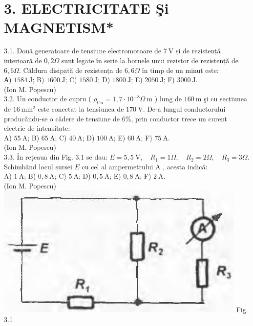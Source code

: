 \documentclass[10pt]{article}
\begin{document}
\section*{3. ELECTRICITATE Şi MAGNETISM*}


3.1. Două generatoare de tensiune electromotoare de $7 \mathrm{~V}$ și de rezistență interioară de $0,2 \Omega$ sunt legate în serie la bornele unui rezistor de rezistență de $6,6 \Omega$. Căldura disipată de rezistența de $6,6 \Omega$ în timp de un minut este:\\ А) $1584 \mathrm{~J}$; B) $1600 \mathrm{~J}$; C) $1580 \mathrm{~J}$; D) $1800 \mathrm{~J}$; E) $2050 \mathrm{~J}$; F) $3000 \mathrm{~J}$.\\ (Ion M. Popescu)\\

3.2. Un conductor de cupru ( $\rho_{\mathrm{Cu}}=1,7 \cdot 10^{-8} \Omega \mathrm{~m}$ ) lung de $160 \mathrm{~m}$ şi cu secțiunea de $16 \mathrm{~mm}^{2}$ este conectat la tensiunea de $170 \mathrm{~V}$. De-a lungul conductorului producându-se o cădere de tensiune de $6 \%$, prin conductor trece un curent electric de intensitate:\\ A) $55 \mathrm{~A}$; B) $65 \mathrm{~A}$; C) $40 \mathrm{~A}$; D) $100 \mathrm{~A}$; E) $60 \mathrm{~A}$; F) $75 \mathrm{~A}$.\\ (Ion M. Popescu)\\

3.3. În rețeaua din Fig. 3.1 se dau: $E=5,5 \mathrm{~V}, \quad R_{1}=1 \Omega, \quad R_{2}=2 \Omega, \quad R_{3}=3 \Omega$. Schimbând locul sursei $E$ cu cel al ampermetrului A , acesta indică:\\ A) $1 \mathrm{~A}$; B) $0,8 \mathrm{~A}$; C) $5 \mathrm{~A}$; D) $0,5 \mathrm{~A}$; E) $0,8 \mathrm{~A}$; F) $2 \mathrm{~A}$.\\ (Ion M. Popescu)\\ \includegraphics[max width=\textwidth, center]{2025_07_01_5b3ff9fa0d508c8e9f17g-144} Fig. 3.1\\
\end{document}
